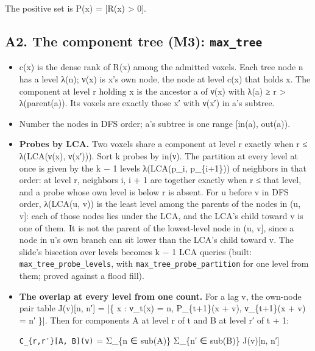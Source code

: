 The positive set is P(x) = [R(x) > 0].

\subsection{\texorpdfstring{A2. The component tree (M3): \texttt{max\_\allowbreak{}tree}}{A2. The component tree (M3): max\_tree}}

\begin{itemize}
\item c(x) is the dense rank of R(x) among the admitted voxels. Each tree node n has a level λ(n); ν(x) is x's own node, the node at level c(x) that holds x. The component at level r holding x is the ancestor a of ν(x) with λ(a) ≥ r > λ(parent(a)). Its voxels are exactly those x′ with ν(x′) in a's subtree.
\item Number the nodes in DFS order; a's subtree is one range [in(a), out(a)).
\item \textbf{Probes by LCA.} Two voxels share a component at level r exactly when r ≤ λ(LCA(ν(x), ν(x′))). Sort k probes by in(ν). The partition at every level at once is given by the k − 1 levels λ(LCA(p\_\allowbreak{}i, p\_\allowbreak{}\{i+1\})) of neighbors in that order: at level r, neighbors i, i + 1 are together exactly when r ≤ that level, and a probe whose own level is below r is absent. For u before v in DFS order, λ(LCA(u, v)) is the least level among the parents of the nodes in (u, v]: each of those nodes lies under the LCA, and the LCA's child toward v is one of them. It is not the parent of the lowest-level node in (u, v], since a node in u's own branch can sit lower than the LCA's child toward v. The slide's bisection over levels becomes k − 1 LCA queries (built: \texttt{max\_\allowbreak{}tree\_\allowbreak{}probe\_\allowbreak{}levels}, with \texttt{max\_\allowbreak{}tree\_\allowbreak{}probe\_\allowbreak{}partition} for one level from them; proved against a flood fill).
\item \textbf{The overlap at every level from one count.} For a lag v, the own-node pair table J(v)[n, n′] = |\{ x : ν\_\allowbreak{}t(x) = n, P\_\allowbreak{}\{t+1\}(x + v), ν\_\allowbreak{}\{t+1\}(x + v) = n′ \}|. Then for components A at level r of t and B at level r′ of t + 1:

\texttt{C\_\allowbreak{}\{r,r′\}[A, B](v)} = Σ\_\allowbreak{}\{n ∈ sub(A)\} Σ\_\allowbreak{}\{n′ ∈ sub(B)\} J(v)[n, n′]


\end{itemize}
